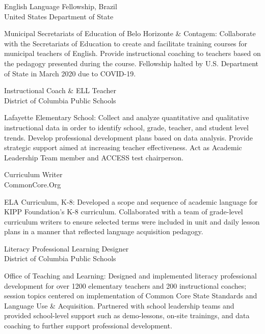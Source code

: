 \documentclass[]{scrartcl}
\begin{document}
\begin{cleanCV}
{English Language Fellowship, Brazil}
{\\United States Department of State}

\JobDesc
{Municipal Secretariats of Education of Belo Horizonte \& Contagem: }
{Collaborate with the Secretariats of Education to create and facilitate training courses for municipal teachers of English. Provide instructional coaching to teachers based on the pedagogy presented during the course. Fellowship halted by U.S. Department of State in March 2020 due to COVID-19.}

{Instructional Coach \& ELL Teacher}
{\\District of Columbia Public Schools}

\JobDesc
{Lafayette Elementary School: }
{Collect and analyze quantitative and qualitative instructional data in order to identify school, grade, teacher, and student level trends. Develop professional development plans based on data analysis. Provide strategic support aimed at increasing teacher effectiveness. Act as Academic Leadership Team member and ACCESS test chairperson.}

{Curriculum Writer}
{\\CommonCore.Org}

\JobDesc
{ELA Curriculum, K-8: }
{Developed a scope and sequence of academic language for KIPP Foundation's K-8 curriculum. Collaborated with a team of grade-level curriculum writers to ensure selected terms were included in unit and daily lesson plans in a manner that reflected language acquisition pedagogy.}

{Literacy Professional Learning Designer}
{\\District of Columbia Public Schools}

\JobDesc
{Office of Teaching and Learning: }
{Designed and implemented literacy professional development for over 1200 elementary teachers and 200 instructional coaches; session topics centered on implementation of Common Core State Standards and Language Use \& Acquisition. Partnered with school leadership teams and provided school-level support such as demo-lessons, on-site trainings, and data coaching to further support professional development.}




\end{cleanCV}
\end{document}
